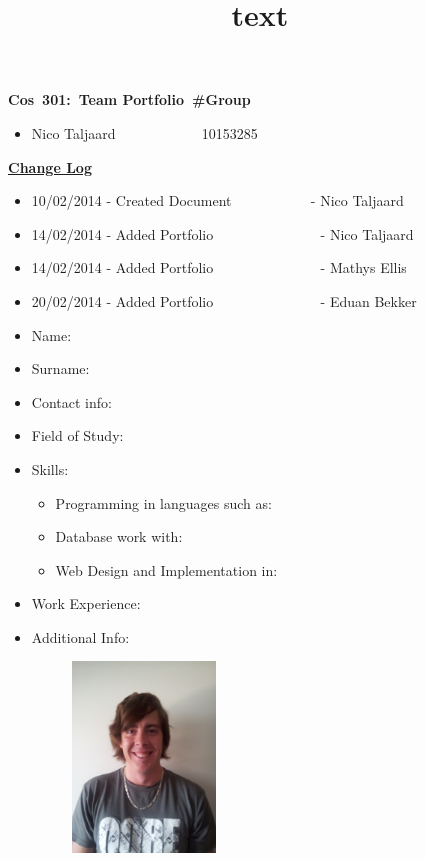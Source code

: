 \documentclass[12pt]{article}
\newcommand{\Title}{Team Portfolio\ \#Group } %
\newcommand{\Class}{Cos\ 301} %
\begin{document}
\title{text}
	\vspace{2in}
	\hspace{1.5in}
	\textmd{\textbf{\Class:\ \Title}}\\
	\vspace{1.5in}


\begin{itemize} %
	\item Nico Taljaard \ ~~~~~~~~~ \ 10153285
	
\end{itemize}

\newpage
\textbf{\underline{Change Log}}
\begin{itemize}
	\item 10/02/2014 - Created Document \ ~~~~~~~~ \ - Nico Taljaard
	\item 14/02/2014 - Added Portfolio \ ~~~~~~~~~~~~ \ - Nico Taljaard
	\item 14/02/2014 - Added Portfolio \ ~~~~~~~~~~~~ \ - Mathys Ellis
	\item 20/02/2014 - Added Portfolio \ ~~~~~~~~~~~~ \ - Eduan Bekker
\end{itemize}


\newpage %

\begin{itemize}
	\item Name: \ ~~~~~~~~~~~~~~~ \ 
	\item Surname: \ ~~~~~~~~~~~ \ 
	\item Contact info: \ ~~~~~~ \  
	\item Field of Study: \ ~~~~ \ 
	\item Skills: \begin{itemize}
					\item Programming in languages such as:
					\item Database work with: 
					\item Web Design and Implementation in:     %
				  \end{itemize}
	\item Work Experience: \  \ 
	\item Additional Info: \ ~~ \ 	
\end{itemize}

\newpage
\begin{figure}[ht!]
	\centering
	\includegraphics[width=2in, height=2in]{./Pictures/NicoTaljaard.jpg}
\end{figure}
\end{document}
